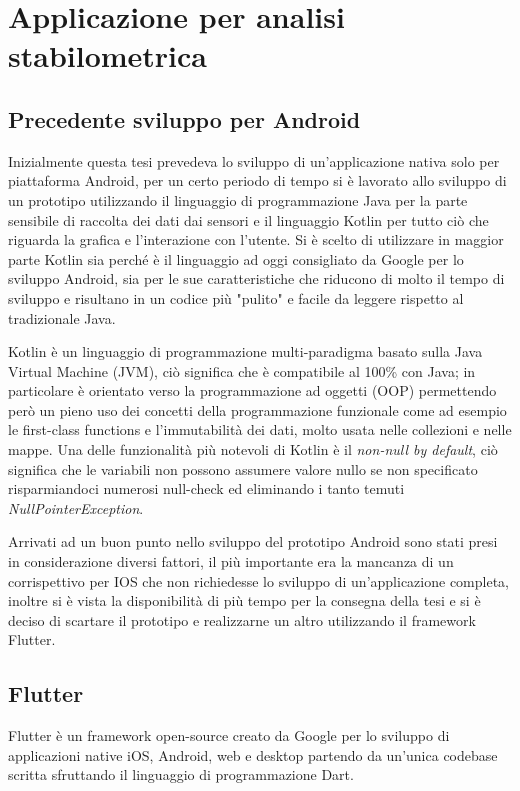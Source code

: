 \chapter{Applicazione per analisi stabilometrica}
\label{cap:applicazione_per_analisi_stabilometrica}

\section{Precedente sviluppo per Android}
Inizialmente questa tesi prevedeva lo sviluppo di un'applicazione nativa solo per piattaforma Android, per un certo periodo di tempo si è lavorato allo sviluppo di un prototipo utilizzando il linguaggio di programmazione Java per la parte sensibile di raccolta dei dati dai sensori e il linguaggio Kotlin per tutto ciò che riguarda la grafica e l'interazione con l'utente. Si è scelto di utilizzare in maggior parte Kotlin sia perché è il linguaggio ad oggi consigliato da Google per lo sviluppo Android, sia per le sue caratteristiche che riducono di molto il tempo di sviluppo e risultano in un codice più "pulito" e facile da leggere rispetto al tradizionale Java. 

Kotlin è un linguaggio di programmazione multi-paradigma basato sulla Java Virtual Machine (JVM), ciò significa che è compatibile al 100\% con Java; in particolare è orientato verso la programmazione ad oggetti (OOP) permettendo però un pieno uso dei concetti della programmazione funzionale come ad esempio le first-class functions e l'immutabilità dei dati, molto usata nelle collezioni e nelle mappe. Una delle funzionalità più notevoli di Kotlin è il {\itshape non-null by default}, ciò significa che le variabili non possono assumere valore nullo se non specificato risparmiandoci numerosi null-check ed eliminando i tanto temuti {\itshape NullPointerException}.

Arrivati ad un buon punto nello sviluppo del prototipo Android sono stati presi in considerazione diversi fattori, il più importante era la mancanza di un corrispettivo per IOS che non richiedesse lo sviluppo di un'applicazione completa, inoltre si è vista la disponibilità di più tempo per la consegna della tesi e si è deciso di scartare il prototipo e realizzarne un altro utilizzando il framework Flutter.

\section{Flutter}
Flutter è un framework open-source creato da Google per lo sviluppo di applicazioni native iOS, Android, web e desktop partendo da un'unica codebase scritta sfruttando il linguaggio di programmazione Dart.

